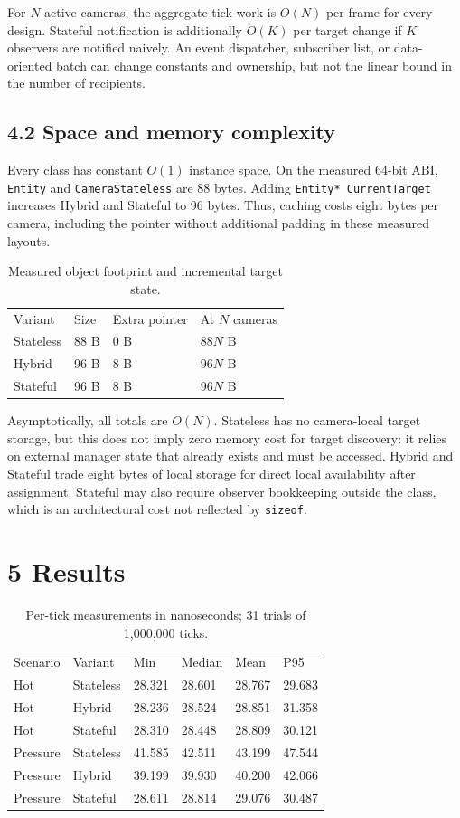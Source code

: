 For \(N\) active cameras, the aggregate tick work is \(O(N)\) per frame for every design. Stateful notification is additionally \(O(K)\) per target change if \(K\) observers are notified naively. An event dispatcher, subscriber list, or data-oriented batch can change constants and ownership, but not the linear bound in the number of recipients.

\subsection{4.2 Space and memory complexity}

Every class has constant \(O(1)\) instance space. On the measured 64-bit ABI, \texttt{Entity} and \texttt{CameraStateless} are 88 bytes. Adding \texttt{Entity* CurrentTarget} increases Hybrid and Stateful to 96 bytes. Thus, caching costs eight bytes per camera, including the pointer without additional padding in these measured layouts.

\begin{table}
\caption{Measured object footprint and incremental target state.}
\begin{tabular}{llll}
Variant & Size & Extra pointer & At \(N\) cameras \\
Stateless & 88 B & 0 B & \(88N\) B \\
Hybrid & 96 B & 8 B & \(96N\) B \\
Stateful & 96 B & 8 B & \(96N\) B \\
\end{tabular}
\end{table}

Asymptotically, all totals are \(O(N)\). Stateless has no camera-local target storage, but this does not imply zero memory cost for target discovery: it relies on external manager state that already exists and must be accessed. Hybrid and Stateful trade eight bytes of local storage for direct local availability after assignment. Stateful may also require observer bookkeeping outside the class, which is an architectural cost not reflected by \texttt{sizeof}.

\section{5 Results}

\begin{table}
\caption{Per-tick measurements in nanoseconds; 31 trials of 1,000,000 ticks.}
\begin{tabular}{llllll}
Scenario & Variant & Min & Median & Mean & P95 \\
Hot & Stateless & 28.321 & 28.601 & 28.767 & 29.683 \\
Hot & Hybrid & 28.236 & 28.524 & 28.851 & 31.358 \\
Hot & Stateful & 28.310 & 28.448 & 28.809 & 30.121 \\
Pressure & Stateless & 41.585 & 42.511 & 43.199 & 47.544 \\
Pressure & Hybrid & 39.199 & 39.930 & 40.200 & 42.066 \\
Pressure & Stateful & 28.611 & 28.814 & 29.076 & 30.487 \\
\end{tabular}
\end{table}

